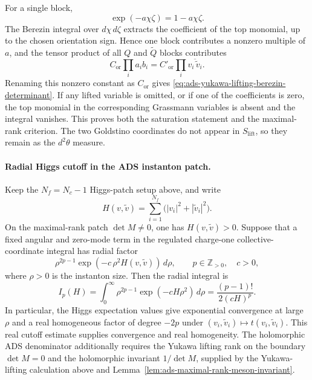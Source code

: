 For a single block,
\[
  \exp(-a\chi\zeta)=1-a\chi\zeta .
\]
The Berezin integral over \(d\chi\,d\zeta\) extracts the coefficient of the
top monomial, up to the chosen orientation sign.  Hence one block contributes
a nonzero multiple of \(a\), and the tensor product of all \(Q\) and
\(\widetilde Q\) blocks contributes
\[
  C_{\mathrm{or}}\prod_i a_i b_i
  =
  C'_{\mathrm{or}}
  \prod_i \overline{v_i\,\widetilde v_i}.
\]
Renaming this nonzero constant as \(C_{\mathrm{or}}\) gives
\eqref{eq:ads-yukawa-lifting-berezin-determinant}.
If any lifted variable is omitted, or if one of the coefficients is zero,
the top monomial in the corresponding Grassmann variables is absent and the
integral vanishes.  This proves both the saturation statement and the
maximal-rank criterion.  The two Goldstino coordinates do not appear in
\(S_{\mathrm{lift}}\), so they remain as the \(d^2\theta\) measure.

\paragraph{Radial Higgs cutoff in the ADS instanton patch.}
Keep the \(N_f=N_c-1\) Higgs-patch setup above, and write
\[
  H(v,\widetilde v)
  =
  \sum_{i=1}^{N_f}
  \bigl(|v_i|^2+|\widetilde v_i|^2\bigr).
\]
On the maximal-rank patch \(\det M\neq0\), one has
\(H(v,\widetilde v)>0\).  Suppose that a fixed angular and zero-mode term in
the regulated charge-one collective-coordinate integral has radial factor
\begin{equation}
  \rho^{2p-1}\exp(-c\,\rho^2H(v,\widetilde v))\,d\rho,
  \qquad p\in\mathbb Z_{>0},\quad c>0,
  \label{eq:ads-radial-higgs-model-integral}
\end{equation}
where \(\rho>0\) is the instanton size.  Then the radial integral is
\begin{equation}
  I_p(H)
  =
  \int_0^\infty
  \rho^{2p-1}\exp(-cH\rho^2)\,d\rho
  =
  \frac{(p-1)!}{2(cH)^p}.
  \label{eq:ads-radial-higgs-integral-value}
\end{equation}
In particular, the Higgs expectation values give exponential convergence at
large \(\rho\) and a real homogeneous factor of degree \(-2p\) under
\((v_i,\widetilde v_i)\mapsto t(v_i,\widetilde v_i)\).  This real cutoff
estimate supplies convergence and real homogeneity.  The holomorphic ADS
denominator additionally requires the Yukawa lifting rank on the boundary
\(\det M=0\) and the holomorphic invariant \(1/\det M\), supplied by the
Yukawa-lifting calculation above and
Lemma~\ref{lem:ads-maximal-rank-meson-invariant}.

